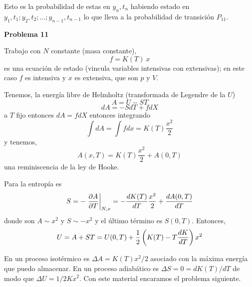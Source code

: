 \documentclass[10pt,oneside]{CBFT_book}
\begin{document}
Esto es la probabilidad de estas en $y_n,t_n$ habiendo estado en $y_1,t_1;y_2,t_2;...;y_{n-1},t_{n-1}$
lo que lleva a la probabilidad de transición $P_{11}$.


\begin{ejemplo}{\bf Problema 11}

Trabajo con $N$ constante (masa constante),
\[
	f = K(T) \: x
\]
es una ecuación de estado (vincula variables intensivas con extensivas); en este caso $f$ es intensiva
y $x$ es extensiva, que son $p$ y $V$.

Tenemos, la energía libre de Helmholtz (transformada de Legendre de la $U$)
\[
	A = U -S T
\]
\[
	dA = - S dT + f dX
\]
a $T$ fijo entonces $dA = f dX$ entonces integrando
\[
	\int dA = \int f dx = K(T) \frac{x^2}{2}
\]
y tenemos,
\[
	A(x,T) = K(T) \frac{x^2}{2} + A(0,T)
\]
una reminiscencia de la ley de Hooke.

Para la entropía es 
\[
	S = - \left.\frac{\partial^{\hspace{-0.05em}} {A}}{\partial {T}^{\hspace{-0.05em}}}\right|_{N,x} = - \frac{d^{\hspace{-0.05em}} {K(T)}}{d {T}^{\hspace{-0.05em}}} \frac{x^2}{2} + \frac{d^{\hspace{-0.05em}} {A(0,T)}}{d {T}^{\hspace{-0.05em}}}
\]
donde son $A \sim x^2$ y $S \sim -x^2$ y el último término es $S(0,T)$.
Entonces,
\[
	U = A + S T = U(0,T) + \frac{1}{2}\left( K(T) - T \frac{d^{\hspace{-0.05em}} {K}}{d {T}^{\hspace{-0.05em}}} \right) x^2
\]

En un proceso isotérmico es $\Delta A = K(T) x^2/2$ asociado con la máxima energía que  puedo
almacenar.
En un proceso adiabático es $\Delta S = 0 = dK(T)/dT$ de modo que $\Delta U = 1/2 K x^2$.
Con este material encaramos el problema siguiente.
 
\end{ejemplo}
\end{document}

